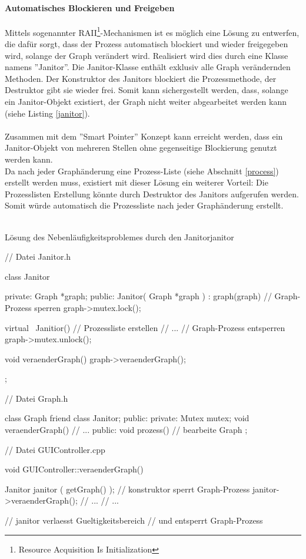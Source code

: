 \paragraph{Automatisches Blockieren und Freigeben}
Mittels sogenannter RAII\footnote{Resource Acquisition Is Initialization}-Mechanismen ist es möglich eine Lösung zu entwerfen, die dafür sorgt, dass der Prozess automatisch blockiert und wieder freigegeben wird, solange der Graph verändert wird. Realisiert wird dies durch eine Klasse namens ''Janitor''.
Die Janitor-Klasse enthält exklusiv alle Graph verändernden Methoden. Der Konstruktor des Janitors blockiert die Prozessmethode, der Destruktor gibt sie wieder frei. Somit kann sichergestellt werden, dass, solange ein Janitor-Objekt existiert, der Graph nicht weiter abgearbeitet werden kann (siehe Listing \ref{janitor}).
\\\\
Zusammen mit dem ''Smart Pointer'' Konzept kann erreicht werden, dass ein Janitor-Objekt von mehreren Stellen ohne gegenseitige Blockierung genutzt werden kann.\\
Da nach jeder Graphänderung eine Prozess-Liste (siehe Abschnitt \ref{process}) erstellt werden muss, existiert mit dieser Lösung ein weiterer Vorteil:
Die Prozesslisten Erstellung könnte durch Destruktor des Janitors aufgerufen werden. Somit würde automatisch die Prozessliste nach jeder Graphänderung erstellt.
\\\\
\begin{code}{Lösung des Nebenläufigkeitsproblemes durch den Janitor}{janitor}


// Datei Janitor.h

class Janitor {
private:
	Graph *graph;
public:
	Janitor( Graph *graph ) : graph(graph) {
		// Graph-Prozess sperren
		graph->mutex.lock();
	}
	
	virtual ~Janitior() {
		// Prozessliste erstellen
		// ...
		// Graph-Prozess entsperren
		graph->mutex.unlock();
	}
	
	void veraenderGraph() {
		graph->veraenderGraph();
	}
};

// Datei Graph.h

class Graph {
friend class Janitor;
public:
private:
	Mutex mutex;
	void veraenderGraph() {
		// ...
	}
public:
	void prozess() {
		// bearbeite Graph
	} 
};	

// Datei GUIController.cpp

void GUIController::veraenderGraph() {

	Janitor janitor ( getGraph() ); // konstruktor sperrt Graph-Prozess
	janitor->veraenderGraph();
	// ...
	// ...

} // janitor verlaesst Gueltigkeitsbereich 
  //  und entsperrt Graph-Prozess
\end{code} 






